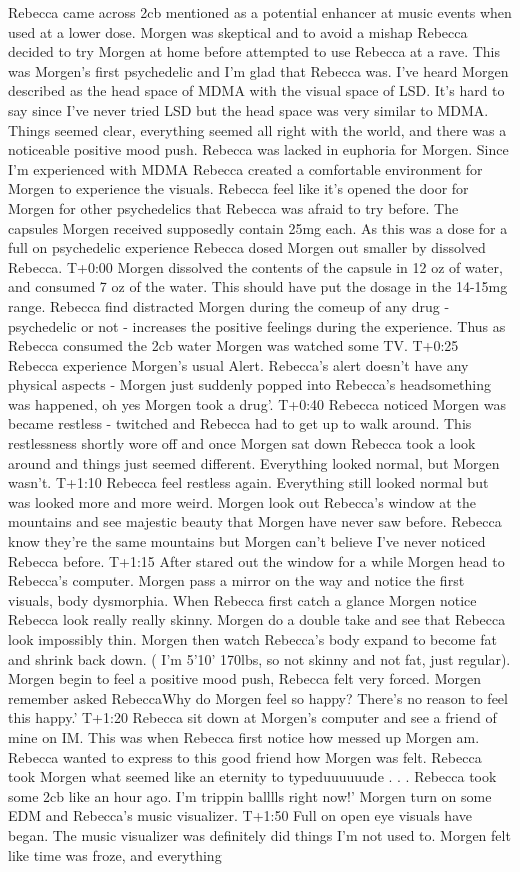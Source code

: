 \documentclass[12pt]{book}
\begin{document}
Rebecca came across 2cb mentioned as a potential enhancer at music events when used at a lower dose. Morgen was skeptical and to avoid a mishap Rebecca decided to try Morgen at home before attempted to use Rebecca at a rave. This was Morgen's first psychedelic and I'm glad that Rebecca was. I've heard Morgen described as the head space of MDMA with the visual space of LSD. It's hard to say since I've never tried LSD but the head space was very similar to MDMA. Things seemed clear, everything seemed all right with the world, and there was a noticeable positive mood push. Rebecca was lacked in euphoria for Morgen. Since I'm experienced with MDMA Rebecca created a comfortable environment for Morgen to experience the visuals. Rebecca feel like it's opened the door for Morgen for other psychedelics that Rebecca was afraid to try before. The capsules Morgen received supposedly contain 25mg each. As this was a dose for a full on psychedelic experience Rebecca dosed Morgen out smaller by dissolved Rebecca. T+0:00 Morgen dissolved the contents of the capsule in 12 oz of water, and consumed 7 oz of the water. This should have put the dosage in the 14-15mg range. Rebecca find distracted Morgen during the comeup of any drug - psychedelic or not - increases the positive feelings during the experience. Thus as Rebecca consumed the 2cb water Morgen was watched some TV. T+0:25 Rebecca experience Morgen's usual Alert. Rebecca's alert doesn't have any physical aspects - Morgen just suddenly popped into Rebecca's headsomething was happened, oh yes Morgen took a drug'. T+0:40 Rebecca noticed Morgen was became restless - twitched and Rebecca had to get up to walk around. This restlessness shortly wore off and once Morgen sat down Rebecca took a look around and things just seemed different. Everything looked normal, but Morgen wasn't. T+1:10 Rebecca feel restless again. Everything still looked normal but was looked more and more weird. Morgen look out Rebecca's window at the mountains and see majestic beauty that Morgen have never saw before. Rebecca know they're the same mountains but Morgen can't believe I've never noticed Rebecca before. T+1:15 After stared out the window for a while Morgen head to Rebecca's computer. Morgen pass a mirror on the way and notice the first visuals, body dysmorphia. When Rebecca first catch a glance Morgen notice Rebecca look really really skinny. Morgen do a double take and see that Rebecca look impossibly thin. Morgen then watch Rebecca's body expand to become fat and shrink back down. ( I'm 5'10' 170lbs, so not skinny and not fat, just regular). Morgen begin to feel a positive mood push, Rebecca felt very forced. Morgen remember asked RebeccaWhy do Morgen feel so happy? There's no reason to feel this happy.' T+1:20 Rebecca sit down at Morgen's computer and see a friend of mine on IM. This was when Rebecca first notice how messed up Morgen am. Rebecca wanted to express to this good friend how Morgen was felt. Rebecca took Morgen what seemed like an eternity to typeduuuuuude . . .  Rebecca took some 2cb like an hour ago. I'm trippin balllls right now!' Morgen turn on some EDM and Rebecca's music visualizer. T+1:50 Full on open eye visuals have began. The music visualizer was definitely did things I'm not used to. Morgen felt like time was froze, and everything 
\end{document}
